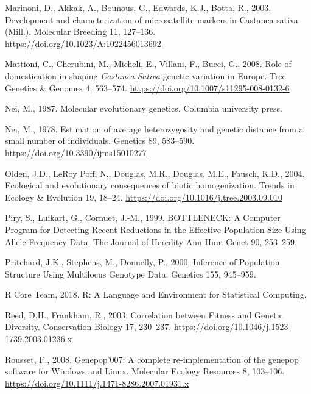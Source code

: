 \documentclass[12pt,a4paper,]{report}
\begin{document}
\leavevmode\hypertarget{ref-marinoni_development_2003}{}%
Marinoni, D., Akkak, A., Bounous, G., Edwards, K.J., Botta, R., 2003.
Development and characterization of microsatellite markers in Castanea
sativa (Mill.). Molecular Breeding 11, 127--136.
\url{https://doi.org/10.1023/A:1022456013692}

\leavevmode\hypertarget{ref-Mattioni2008}{}%
Mattioni, C., Cherubini, M., Micheli, E., Villani, F., Bucci, G., 2008.
Role of domestication in shaping \emph{Castanea} \emph{Sativa} genetic
variation in Europe. Tree Genetics \& Genomes 4, 563--574.
\url{https://doi.org/10.1007/s11295-008-0132-6}

\leavevmode\hypertarget{ref-nei1987molecular}{}%
Nei, M., 1987. Molecular evolutionary genetics. Columbia university
press.

\leavevmode\hypertarget{ref-Nei1978}{}%
Nei, M., 1978. Estimation of average heterozygosity and genetic distance
from a small number of individuals. Genetics 89, 583--590.
\url{https://doi.org/10.3390/ijms15010277}

\leavevmode\hypertarget{ref-olden_ecological_2004}{}%
Olden, J.D., LeRoy Poff, N., Douglas, M.R., Douglas, M.E., Fausch, K.D.,
2004. Ecological and evolutionary consequences of biotic homogenization.
Trends in Ecology \& Evolution 19, 18--24.
\url{https://doi.org/10.1016/j.tree.2003.09.010}

\leavevmode\hypertarget{ref-Piry1999}{}%
Piry, S., Luikart, G., Cornuet, J.-M., 1999. BOTTLENECK: A Computer
Program for Detecting Recent Reductions in the Effective Population Size
Using Allele Frequency Data. The Journal of Heredity Ann Hum Genet 90,
253--259.

\leavevmode\hypertarget{ref-pritchard_inference_2000}{}%
Pritchard, J.K., Stephens, M., Donnelly, P., 2000. Inference of
Population Structure Using Multilocus Genotype Data. Genetics 155,
945--959.

\leavevmode\hypertarget{ref-RCoreTeam2018}{}%
R Core Team, 2018. R: A Language and Environment for Statistical
Computing.

\leavevmode\hypertarget{ref-Reed2003}{}%
Reed, D.H., Frankham, R., 2003. Correlation between Fitness and Genetic
Diversity. Conservation Biology 17, 230--237.
\url{https://doi.org/10.1046/j.1523-1739.2003.01236.x}

\leavevmode\hypertarget{ref-Rousset2008}{}%
Rousset, F., 2008. Genepop'007: A complete re-implementation of the
genepop software for Windows and Linux. Molecular Ecology Resources 8,
103--106. \url{https://doi.org/10.1111/j.1471-8286.2007.01931.x}
\end{document}
